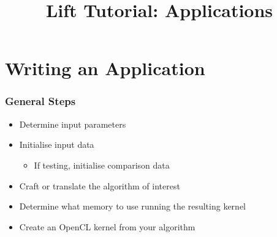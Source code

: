 \documentclass[10pt]{beamer}
\title{Lift Tutorial: Applications}
\date{}
\begin{document}
\begin{frame}
\maketitle
\end{frame}

\section{Writing an Application}

\begin{frame}
\frametitle{General Steps}
\begin{itemize}
    \item Determine input parameters 
    \item Initialise input data 
            \begin{itemize}
                \item If testing, initialise comparison data 
            \end{itemize}
    \item Craft or translate the algorithm of interest 
    \item Determine what memory to use running the resulting kernel 
    \item Create an OpenCL kernel from your algorithm 
\end{itemize}
\end{frame}
\end{document}
